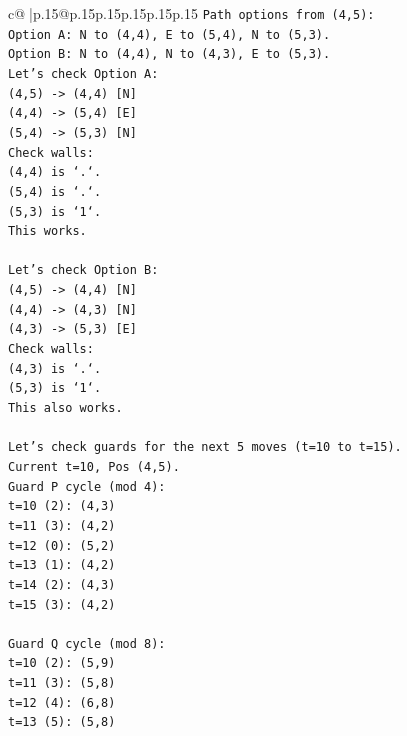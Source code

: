 \documentclass{article}
\begin{document}
{\begin{supertabular}{c@{$\;$}|p{.15\linewidth}@{}p{.15\linewidth}p{.15\linewidth}p{.15\linewidth}p{.15\linewidth}p{.15\linewidth}}
{{{\texttt{Path options from (4,5):} \\
\texttt{Option A: N to (4,4), E to (5,4), N to (5,3).} \\
\texttt{Option B: N to (4,4), N to (4,3), E to (5,3).} \\
\texttt{Let's check Option A:} \\
\texttt{(4,5) {-}> (4,4) {[}N{]}} \\
\texttt{(4,4) {-}> (5,4) {[}E{]}} \\
\texttt{(5,4) {-}> (5,3) {[}N{]}} \\
\texttt{Check walls:} \\
\texttt{(4,4) is `.`.} \\
\texttt{(5,4) is `.`.} \\
\texttt{(5,3) is `1`.} \\
\texttt{This works.} \\
\\ 
\texttt{Let's check Option B:} \\
\texttt{(4,5) {-}> (4,4) {[}N{]}} \\
\texttt{(4,4) {-}> (4,3) {[}N{]}} \\
\texttt{(4,3) {-}> (5,3) {[}E{]}} \\
\texttt{Check walls:} \\
\texttt{(4,3) is `.`.} \\
\texttt{(5,3) is `1`.} \\
\texttt{This also works.} \\
\\ 
\texttt{Let's check guards for the next 5 moves (t=10 to t=15).} \\
\texttt{Current t=10, Pos (4,5).} \\
\texttt{Guard P cycle (mod 4):} \\
\texttt{t=10 (2): (4,3)} \\
\texttt{t=11 (3): (4,2)} \\
\texttt{t=12 (0): (5,2)} \\
\texttt{t=13 (1): (4,2)} \\
\texttt{t=14 (2): (4,3)} \\
\texttt{t=15 (3): (4,2)} \\
\\ 
\texttt{Guard Q cycle (mod 8):} \\
\texttt{t=10 (2): (5,9)} \\
\texttt{t=11 (3): (5,8)} \\
\texttt{t=12 (4): (6,8)} \\
\texttt{t=13 (5): (5,8)} \\
}}}
\end{supertabular}}
\end{document}
